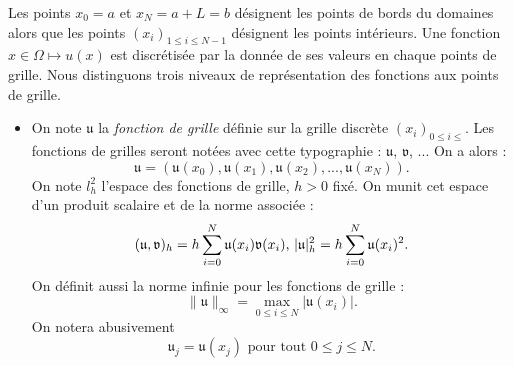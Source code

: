 Les points $x_0=a$ et $x_N = a + L = b$ désignent les points de bords du domaines alors que les points $(x_i)_{1 \leq i \leq N-1}$ désignent les points intérieurs. Une fonction $x \in \Omega \mapsto u(x)$ est discrétisée par la donnée de ses valeurs en chaque points de grille.
Nous distinguons trois niveaux de représentation des fonctions aux points de grille.
\begin{itemize}
\item On note $\mathfrak{u}$ la \textit{fonction de grille} définie sur la grille discrète $(x_i)_{0 \leq i \leq}$. Les fonctions de grilles seront notées avec cette typographie : $\mathfrak{u}$, $\mathfrak{v}$, ... 
On a alors :
\begin{equation}
\mathfrak{u} = (\mathfrak{u}(x_0), \mathfrak{u}(x_1), \mathfrak{u}(x_2), ... , \mathfrak{u}(x_N)).
\end{equation}
On note $l^2_h$ l'espace des fonctions de grille, $h>0$ fixé.
On munit cet espace d'un produit scalaire et de la norme associée :
\begin{equation}
(\mathfrak{u},\mathfrak{v})_h = h \displaystyle\sum\limits_{i=0}^N \mathfrak{u}(x_i) \mathfrak{v}(x_i) \text{,  } |\mathfrak{u}|_h^2 = h \displaystyle\sum\limits_{i=0}^N \mathfrak{u}(x_i)^2.
\end{equation}
On définit aussi la norme infinie pour les fonctions de grille :
\begin{equation}
\| \mathfrak{u} \|_{\infty} = \max_{0\leq i \leq N} |\mathfrak{u}(x_i)|.
\end{equation}
On notera abusivement 
\begin{equation}
\mathfrak{u}_j = \mathfrak{u}(x_j) \text{ pour tout } 0\leq j \leq N.  
\end{equation}


\end{itemize}
